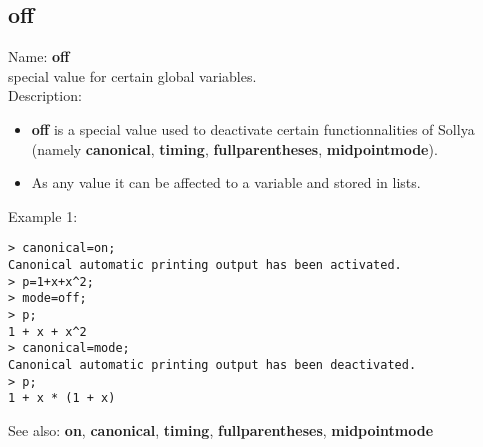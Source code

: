 \subsection{ off }
\noindent Name: \textbf{off}\\
special value for certain global variables.\\

\noindent Description: \begin{itemize}

\item \textbf{off} is a special value used to deactivate certain functionnalities
   of Sollya (namely \textbf{canonical}, \textbf{timing}, \textbf{fullparentheses}, \textbf{midpointmode}).

\item As any value it can be affected to a variable and stored in lists.
\end{itemize}
\noindent Example 1: 
\begin{center}\begin{minipage}{15cm}\begin{Verbatim}[frame=single]
> canonical=on;
Canonical automatic printing output has been activated.
> p=1+x+x^2;
> mode=off;
> p;
1 + x + x^2
> canonical=mode;
Canonical automatic printing output has been deactivated.
> p;
1 + x * (1 + x)
\end{Verbatim}
\end{minipage}\end{center}
See also: \textbf{on}, \textbf{canonical}, \textbf{timing}, \textbf{fullparentheses}, \textbf{midpointmode}
